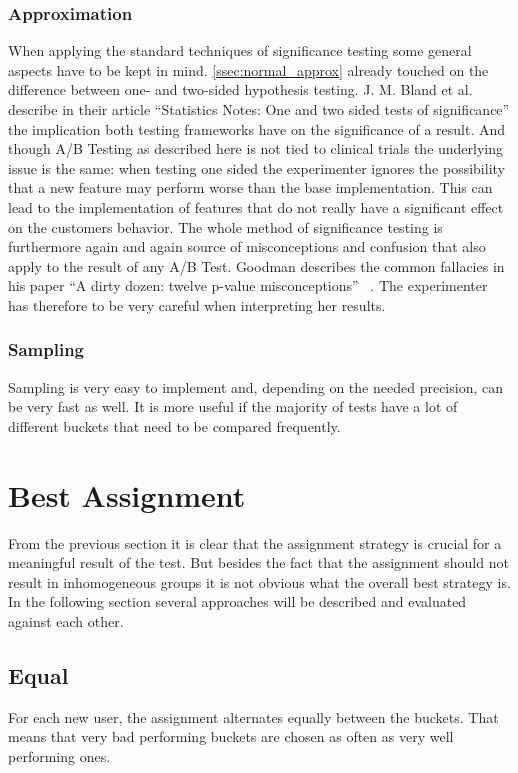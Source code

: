 \documentclass[../Thesis.tex]{subfiles}
\begin{document}
\subsubsection{Approximation}
When applying the standard techniques of significance testing some general aspects have to be kept in mind. \ref{ssec:normal_approx} already touched on the difference between one- and two-sided hypothesis testing. J. M. Bland et al.~\cite{bland1994statistics} describe in their article ``Statistics Notes: One and two sided tests of significance'' the implication both testing frameworks have on the significance of a result. And though A/B Testing as described here is not tied to clinical trials the underlying issue is the same: when testing one sided the experimenter ignores the possibility that a new feature may perform worse than the base implementation. This can lead to the implementation of features that do not really have a significant effect on the customers behavior.
The whole method of significance testing is furthermore again and again source of misconceptions and confusion that also apply to the result of any A/B Test. Goodman describes the common fallacies in his paper ``A dirty dozen: twelve p-value misconceptions'' ~\cite{goodman2008dirty}. The experimenter has therefore to be very careful when interpreting her results.

\subsubsection{Sampling}
Sampling is very easy to implement and, depending on the needed precision, can be very fast as well. It is more useful if the majority of tests have a lot of different buckets that need to be compared frequently.

\section{Best Assignment}
From the previous section it is clear that the assignment strategy is crucial for a meaningful result of the test. But besides the fact that the assignment should not result in inhomogeneous groups it is not obvious what the overall best strategy is. In the following section several approaches will be described and evaluated against each other.

\subsection{Equal}
For each new user, the assignment alternates equally between the buckets. That means that very bad performing buckets are chosen as often as very well performing ones.
\end{document}
